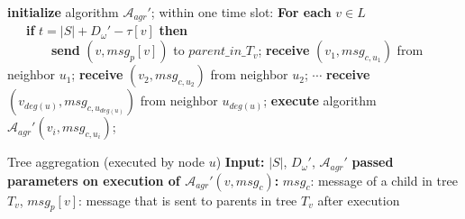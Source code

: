 \documentclass[11pt]{article}
\begin{document}
\begin{algorithm}[ht]
\begin{algorithmic}[1]
\STATE \textbf{initialize} algorithm $\mathcal{A}_{agr}'$;
        \STATE within one time slot:
        \newline \textbf{For each} $v\in L$ \\
                 \ \ \ \textbf{if} $t=|S|+D_{\omega}'-\tau[v]$ \textbf{then}\\
                         \ \ \ \ \ \ \ \textbf{send} $\left(v,msg_p[v]\right)$ to $parent\_in\_T_{v}$;
        \newline \textbf{receive} $\left(v_1,msg_{c,u_1}\right)$ from neighbor $u_1$;
        \newline \textbf{receive} $\left(v_2,msg_{c,u_2}\right)$ from neighbor $u_2$;
        \newline $\cdots$
        \newline \textbf{receive} $\left(v_{deg(u)},msg_{c,u_{deg(u)}}\right)$ from neighbor $u_{deg(u)}$;
                        \STATE \textbf{execute} algorithm $\mathcal{A}_{agr}'(v_i, msg_{c,u_i})$;
                \ENDIF
        \ENDFOR
\ENDFOR
\end{algorithmic}
\caption{Tree aggregation (executed by node $u$) \newline
        \textbf{Input:} $|S|$, $D_\omega'$, $\mathcal{A}_{agr}'$   \newline
        \textbf{passed parameters on execution of $\mathcal{A}_{agr}'(v,msg_c)$:} $msg_c$: message of a child in tree $T_v$, $msg_p[v]$: message that is sent to parents in tree $T_v$ after execution}
\label{alg:TreeAggregating}
\end{algorithm}
\end{document}
